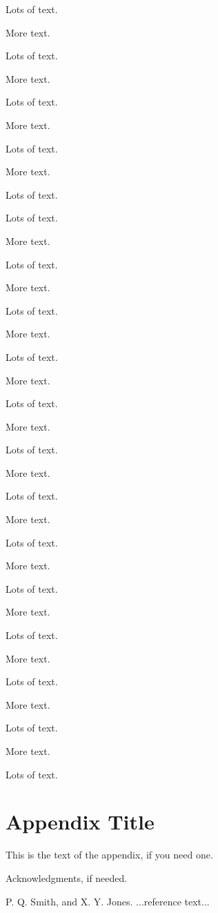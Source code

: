 \documentclass[cm]{sigplanconf}
\begin{document}
Lots of text.

More text.

Lots of text.

More text.




Lots of text.

More text.

Lots of text.

More text.

Lots of text.


Lots of text.

More text.

Lots of text.

More text.

Lots of text.

More text.

Lots of text.

More text.

Lots of text.

More text.

Lots of text.

More text.

Lots of text.

More text.

Lots of text.

More text.

Lots of text.

More text.

Lots of text.

More text.

Lots of text.

More text.

Lots of text.

More text.

Lots of text.

\appendix
\section{Appendix Title}

This is the text of the appendix, if you need one.

\acks

Acknowledgments, if needed.





\begin{thebibliography}{}
\softraggedright

P. Q. Smith, and X. Y. Jones. ...reference text...

\end{thebibliography}
\end{document}
